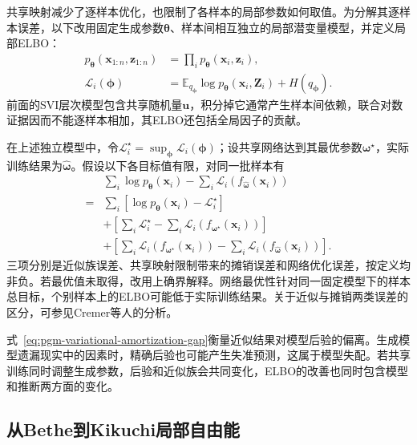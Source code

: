 共享映射减少了逐样本优化，也限制了各样本的局部参数如何取值。为分解其逐样本误差，以下改用固定生成参数$\bm\theta$、样本间相互独立的局部潜变量模型，并定义局部ELBO：
\[
  \begin{aligned}
    p_{\bm\theta}(\bm x_{1:n},\bm z_{1:n})
      &=\prod_i p_{\bm\theta}(\bm x_i,\bm z_i),\\
    \mathcal L_i(\bm\phi)
      &=\mathbb E_{q_{\bm\phi}}
          \log p_{\bm\theta}(\bm x_i,\bm Z_i)+H(q_{\bm\phi}).
  \end{aligned}
\]
前面的SVI层次模型包含共享随机量$\bm u$，积分掉它通常产生样本间依赖，联合对数证据因而不能逐样本相加，其ELBO还包括全局因子的贡献。

在上述独立模型中，令$\mathcal L_i^\star=\sup_{\bm{\phi}}\mathcal L_i(\bm{\phi})$；设共享网络达到其最优参数$\bm{\omega}^\star$，实际训练结果为$\widehat{\bm{\omega}}$。假设以下各目标值有限，对同一批样本有
\begin{equation}
  \begin{aligned}
    &\sum_i\log p_{\bm\theta}(\bm x_i)
       -\sum_i\mathcal L_i(f_{\widehat{\bm{\omega}}}(\bm x_i))\\
    ={}&\sum_i[\log p_{\bm\theta}(\bm x_i)-\mathcal L_i^\star]\\
     &+\left[\sum_i\mathcal L_i^\star
          -\sum_i\mathcal L_i(f_{\bm{\omega}^\star}(\bm x_i))\right]\\
     &+\left[\sum_i\mathcal L_i(f_{\bm{\omega}^\star}(\bm x_i))
          -\sum_i\mathcal L_i(f_{\widehat{\bm{\omega}}}(\bm x_i))\right].
  \end{aligned}
  \label{eq:pgm-variational-amortization-gap}
\end{equation}
三项分别是近似族误差、共享映射限制带来的摊销误差和网络优化误差，按定义均非负。若最优值未取得，改用上确界解释。网络最优性针对同一固定模型下的样本总目标，个别样本上的ELBO可能低于实际训练结果。关于近似与摊销两类误差的区分，可参见Cremer等人的分析。

式~\eqref{eq:pgm-variational-amortization-gap}衡量近似结果对模型后验的偏离。生成模型遗漏现实中的因素时，精确后验也可能产生失准预测，这属于模型失配。若共享训练同时调整生成参数，后验和近似族会共同变化，ELBO的改善也同时包含模型和推断两方面的变化。

\subsection{从Bethe到Kikuchi局部自由能}
\label{sec:pgm-variational-bethe-kikuchi}
\label{sec:pgm-variational-local-free-energy}
\label{sec:pgm-variational-bethe}

